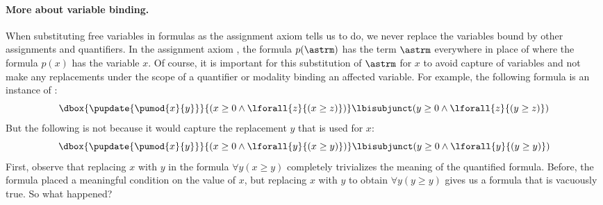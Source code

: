 \documentclass[11pt,twoside]{scrartcl}
\begin{document}
\paragraph{More about variable binding.}
When substituting free variables in formulas as the assignment axiom tells us to do, we never replace the variables bound by other assignments and quantifiers.
In the assignment axiom , the formula $p(\astrm)$ has the term $\astrm$ everywhere in place of where the formula $p(x)$ has the variable $x$.
Of course, it is important for this substitution of $\astrm$ for $x$ to avoid capture of variables and not make any replacements under the scope of a quantifier or modality binding an affected variable.
For example, the following formula is an instance of :
\[
\dbox{\pupdate{\pumod{x}{y}}}{(x\geq0 \land \lforall{z}{(x\geq z)})} \lbisubjunct (y\geq0 \land \lforall{z}{(y\geq z)})
\]
But the following is not because it would capture the replacement $y$ that is used for $x$:
\[
\dbox{\pupdate{\pumod{x}{y}}}{(x\geq0 \land \lforall{y}{(x\geq y)})} \lbisubjunct (y\geq0 \land \lforall{y}{(y\geq y)})
\]
First, observe that replacing $x$ with $y$ in the formula $\forall y (x \ge y)$ completely trivializes the meaning of the quantified formula.
Before, the formula placed a meaningful condition on the value of $x$, but replacing $x$ with $y$ to obtain $\forall y (y \ge y)$ gives us a formula that is vacuously true.
So what happened?
\end{document}
